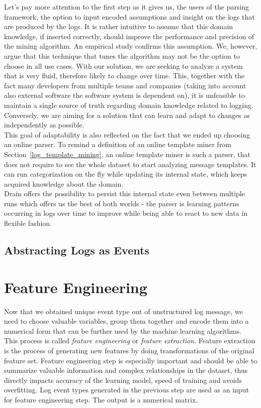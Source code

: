 Let's pay more attention to the first step as it gives us, the users of the parsing framework, the option to input encoded assumptions and insight on the logs that are produced by the logs.
It is rather intuitive to assume that this domain knowledge, if inserted correctly, should improve the performance and precision of the mining algorithm. An empirical study \cite{he2016} confirms this assumption.
We, however, argue that this technique that tunes the algorithm may not be the option to choose in all use cases. With our solution, we are seeking to analyze a system that is very fluid, therefore likely to change over time. This, together with the fact many developers from multiple teams and companies (taking into account also external software the software system is dependent on), it is unfeasible to maintain a single source of truth regarding domain knowledge related to logging. Conversely, we are aiming for a solution that can learn and adapt to changes as independently as possible.\\

This goal of adaptability is also reflected on the fact that we ended up choosing an online parser.
To remind a definition of an online template miner from Section~\ref{log_template_mining}, an online template miner is such a parser, that does not require to see the whole dataset to start analyzing message templates. It can run categorization on the fly while updating its internal state, which keeps acquired knowledge about the domain.\\
Drain offers the possibility to persist this internal state even between multiple runs which offers us the best of both worlds - the parser is learning patterns occurring in logs over time to improve while being able to react to new data in flexible fashion.

\subsection{Abstracting Logs as Events}

\section{Feature Engineering}
\label{section:featureEngineering}
Now that we obtained unique event type out of unstructured log message, we need to choose valuable variables, group them together and encode them into a numerical form that can be further used by the machine learning algorithms.  This process is called \textit{feature engineering} or \textit{feature extraction}. Feature extraction is the process of generating new features by doing transformations of the original feature set.  
Feature engineering step is especially important and should be able to summarize valuable information and complex relationships in the dataset, thus directly impacts accuracy of the learning model, speed of training and avoids overfitting. Log event types generated in the previous step are used as an input for feature engineering step. The output is a numerical matrix. 


